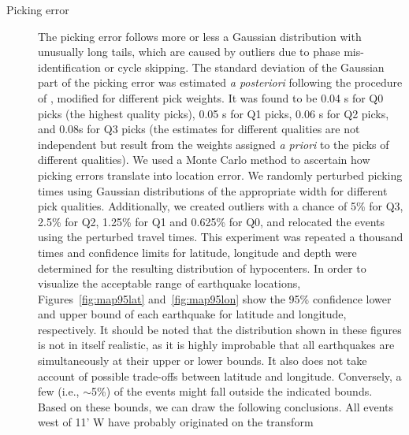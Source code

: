 \documentclass[jgr]{agu2001}
\newlength{\tw}
\begin{document}
\begin{article}
\begin{description}
\item[Picking error]
The picking error follows more or less a Gaussian distribution with
unusually long tails, which are caused by outliers due to phase mis-identification
or cycle skipping.   The standard deviation of the Gaussian
part of the picking
error was estimated {\it a posteriori} following the procedure of \citet{wilcock91},
modified for different pick weights.  It was found to be 0.04 s for
Q0 picks (the highest quality picks), 0.05 s for Q1 picks, 0.06 s for Q2 picks, and 0.08s
for Q3 picks (the estimates for different qualities are not
independent but result from the weights assigned {\it a priori} to the
picks of different qualities). We  used a Monte Carlo method to ascertain how picking errors
translate into location error. We randomly perturbed picking times
using Gaussian distributions of the appropriate width for different pick
qualities.  Additionally, we created outliers with
a chance of 5\% for Q3, 2.5\% for Q2, 1.25\% for Q1 and 0.625\% for
Q0, and relocated the events using the perturbed travel times. This
experiment was repeated a thousand times and confidence limits for
latitude, longitude and depth were determined for the resulting distribution of
hypocenters.  
 In order to visualize the acceptable range
of earthquake locations, Figures~\ref{fig:map95lat}
and~\ref{fig:map95lon} show the 95\% confidence lower and upper bound of each
earthquake for latitude and longitude, respectively. It should be
noted that the distribution shown in these figures is not in itself realistic, as it is
highly improbable that all earthquakes are simultaneously at their
upper or lower bounds. It also does not take account of possible
trade-offs between latitude and longitude.  Conversely, a few
(i.e., $\sim$5\%) of the events might fall outside the indicated
bounds.  Based on these bounds, we can draw the following conclusions.
All events west of 11' W  have probably originated on the transform

\end{description}
\end{article}
\end{document}
